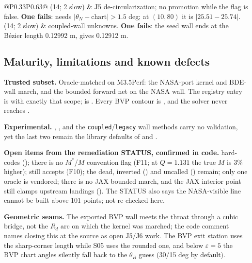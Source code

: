 \begin{longtable}{@{}P{0.33\linewidth}P{0.63\linewidth}@{}}
 (14; 2 slow) & J5 de-circularization; no promotion while the flag is false. \textbf{One fails}:  needs $|\theta_N - \text{chart}| > 1.5$ deg; at $(10, 80)$ it is $|25.51 - 25.74|$. \\
 (14; 2 slow) & coupled-wall unknowns. \textbf{One fails}: the seed wall ends at the B\'ezier length 0.12992 m,  gives 0.12912 m. \\
\bottomrule
\end{longtable}
\endgroup

\subsection{Maturity, limitations and known defects}

\textbf{Trusted subset.} Oracle-matched on M3.5Perf: the NASA-port kernel and BDE-wall march, and the bounded
forward net on the NASA wall. The registry entry  is  with exactly
that scope;  is . Every
BVP contour is , and the solver never reaches .

\textbf{Experimental.} , ,  and the
\texttt{coupled}/\texttt{legacy} wall methods carry no validation, yet the last two remain the library defaults of
 and .

\textbf{Open items from the remediation STATUS, confirmed in code.}  hard-codes
 (); there is no $M^*$/$M$ convention flag (F11; at $Q = 1.131$ the true $M$
is 3\% higher);  still accepts  (F10); the dead, inverted
 () and uncalled  () remain; only
one oracle is vendored; there is no JAX bounded march, and the JAX interior point still clamps upstream landings
(). The STATUS also says the NASA-visible line cannot be built above 101 points;
not re-checked here.

\textbf{Geometric seams.} The exported BVP wall meets the throat through a cubic bridge, not the $R_d$ arc on which
the kernel was marched; the code comment names closing this at the source as open J5/J6 work. The BVP exit
station uses the sharp-corner length while S05 uses the rounded one, and below $\varepsilon = 5$ the BVP chart
angles silently fall back to the $\theta_B$ guess (30/15 deg by default).


